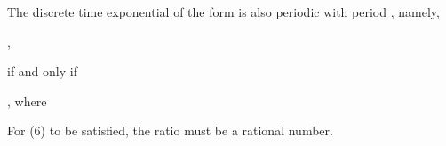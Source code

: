 \documentclass{article}
\begin{document}
\begin{CellGroup}
\begin{CellGroup}
The discrete time exponential of the form  is also periodic
with period , namely,



,

if-and-only-if 

, 	where 

For (6) to be satisfied, the ratio  must be a rational number.



\begin{CellGroup}



\end{CellGroup}

\end{CellGroup}

\end{CellGroup}
\end{document}
